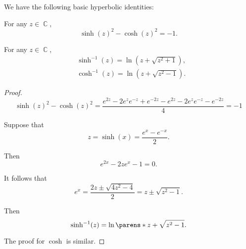 \begin{proposition}\label{thm:hyperbolic_identities}
  We have the following basic hyperbolic identities:
  \begin{thmenum}
     For any \( z \in \BbbC \),
    \begin{equation}\label{eq:thm:hyperbolic_identities/pythagorean_identity}
      \sinh(z)^2 - \cosh(z)^2 = -1.
    \end{equation}

     For any \( z \in \BbbC \),
    \begin{align}
      &\sinh^{-1}(z) = \ln(z + \sqrt{ z^2 + 1 }), \label{eq:thm:hyperbolic_identities/inverse/sinh} \\
      &\cosh^{-1}(z) = \ln(z + \sqrt{ z^2 - 1 }). \label{eq:thm:hyperbolic_identities/inverse/cosh}
    \end{align}
  \end{thmenum}
\end{proposition}
\begin{proof}
  \begin{equation*}
    \sinh(z)^2 - \cosh(z)^2
    =
    \frac {e^{2z} - 2e^z e^{-z} + e^{-2z} - e^{2z} - 2e^z e^{-z} - e^{-2z}} 4
    =
    -1
  \end{equation*}

   Suppose that
  \begin{equation*}
    z = \sinh(x) = \frac {e^x - e^{-x}} 2.
  \end{equation*}

  Then
  \begin{equation*}
    e^{2x} - 2z e^x - 1 = 0.
  \end{equation*}

  It follows that
  \begin{equation*}
    e^x = \frac {2z \pm \sqrt{ 4z^2 - 4 }} 2 = z \pm \sqrt{ z^2 - 1 }.
  \end{equation*}

  Then
  \begin{equation*}
    \sinh^{-1}(z) = \ln\parens*{ z + \sqrt{ z^2 - 1 } }.
  \end{equation*}

  The proof for \( \cosh \) is similar.
\end{proof}
